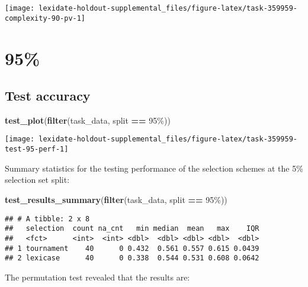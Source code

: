 \documentclass[
]{book}
\newenvironment{Shaded}{\begin{snugshade}}{\end{snugshade}}
\newcommand{\FunctionTok}[1]{\textcolor[rgb]{0.13,0.29,0.53}{\textbf{#1}}}
\newcommand{\NormalTok}[1]{#1}
\newcommand{\SpecialCharTok}[1]{\textcolor[rgb]{0.81,0.36,0.00}{\textbf{#1}}}
\newcommand{\StringTok}[1]{\textcolor[rgb]{0.31,0.60,0.02}{#1}}
\begin{document}
\texttt{[image: lexidate-holdout-supplemental\_files/figure-latex/task-359959-complexity-90-pv-1]}

\hypertarget{section-39}{%
\section{95\%}\label{section-39}}

\hypertarget{test-accuracy-39}{%
\subsection{Test accuracy}\label{test-accuracy-39}}

\begin{Shaded}
\begin{Highlighting}[]
\FunctionTok{test\_plot}\NormalTok{(}\FunctionTok{filter}\NormalTok{(task\_data, split }\SpecialCharTok{==} \StringTok{\textquotesingle{}95\%\textquotesingle{}}\NormalTok{))}
\end{Highlighting}
\end{Shaded}

\texttt{[image: lexidate-holdout-supplemental\_files/figure-latex/task-359959-test-95-perf-1]}

Summary statistics for the testing performance of the selection schemes at the 5\% selection set split:

\begin{Shaded}
\begin{Highlighting}[]
\FunctionTok{test\_results\_summary}\NormalTok{(}\FunctionTok{filter}\NormalTok{(task\_data, split }\SpecialCharTok{==} \StringTok{\textquotesingle{}95\%\textquotesingle{}}\NormalTok{))}
\end{Highlighting}
\end{Shaded}

\begin{verbatim}
## # A tibble: 2 x 8
##   selection  count na_cnt   min median  mean   max    IQR
##   <fct>      <int>  <int> <dbl>  <dbl> <dbl> <dbl>  <dbl>
## 1 tournament    40      0 0.432  0.561 0.557 0.615 0.0439
## 2 lexicase      40      0 0.338  0.544 0.531 0.608 0.0642
\end{verbatim}

The permutation test revealed that the results are:
\end{document}
